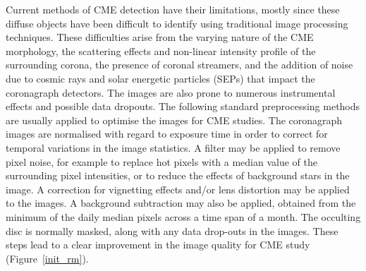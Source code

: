 \documentclass[namedreferences]{SolarPhysics}
\begin{document}
\begin{article}
Current methods of CME detection have their limitations, mostly since these diffuse objects have been difficult to identify using traditional image processing techniques. These difficulties arise from the varying nature of the CME morphology, the scattering effects and non-linear intensity profile of the surrounding corona, the presence of coronal streamers, and the addition of noise due to cosmic rays and solar energetic particles (SEPs) that impact the coronagraph detectors. The images are also prone to numerous instrumental effects and possible data dropouts.  The following standard preprocessing methods are usually applied to optimise the images for CME studies. The coronagraph images are normalised with regard to exposure time in order to correct for temporal variations in the image statistics. A filter may be applied to remove pixel noise, for example to replace hot pixels with a median value of the surrounding pixel intensities, or to reduce the effects of background stars in the image. A correction for vignetting effects and/or lens distortion may be applied to the images. A background subtraction may also be applied, obtained from the minimum of the daily median pixels across a time span of a month. The occulting disc is normally masked, along with any data drop-outs in the images. These steps lead to a clear improvement in the image quality for CME study (Figure~\ref{init_rm}).


\end{article}
\end{document}
